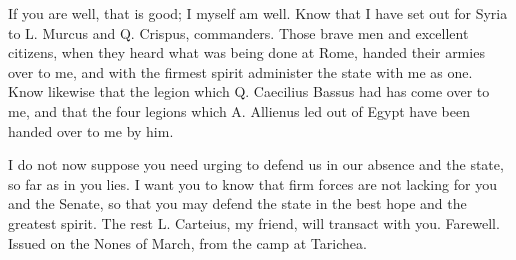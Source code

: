 

 If you are well, that is good; I myself am well. Know that I have set out for Syria to L. Murcus and Q. Crispus, commanders. Those brave men and excellent citizens, when they heard what was being done at Rome, handed their armies over to me, and with the firmest spirit administer the state with me as one. Know likewise that the legion which Q. Caecilius Bassus had has come over to me, and that the four legions which A. Allienus led out of Egypt have been handed over to me by him.

 I do not now suppose you need urging to defend us in our absence and the state, so far as in you lies. I want you to know that firm forces are not lacking for you and the Senate, so that you may defend the state in the best hope and the greatest spirit. The rest L. Carteius, my friend, will transact with you. Farewell. Issued on the Nones of March, from the camp at Tarichea.
